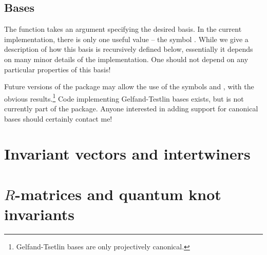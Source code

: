 \subsection{Bases}
The function  takes an argument specifying the
desired basis. In the current implementation, there is only one useful
value -- the symbol . While we give a description
of how this basis is recursively defined below, essentially it depends on
many minor details of the implementation. One should not depend on any
particular properties of this basis!

Future versions of the  package may allow the use of
the symbols  and , with
the obvious results.\footnote{Gelfand-Tsetlin bases are only projectively
canonical.} Code implementing Gelfand-Testlin bases exists, but is not
currently part of the package. Anyone interested in adding support for
canonical bases should certainly contact me!

\section{Invariant vectors and intertwiners}

\section{$R$-matrices and quantum knot invariants}
